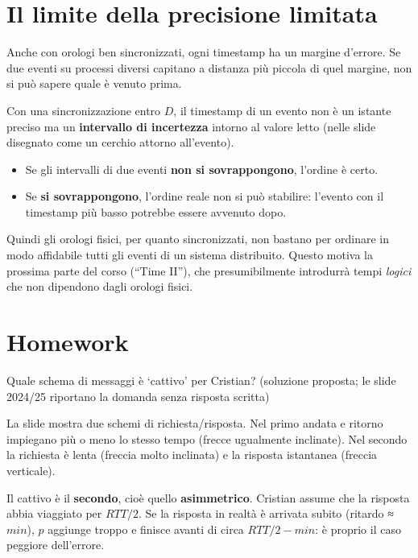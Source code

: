 \section{Il limite della precisione limitata}

\begin{inbreve}

Anche con orologi ben sincronizzati, ogni timestamp ha un margine d'errore. Se due eventi su processi diversi capitano a distanza più piccola di quel margine, non si può sapere quale è venuto prima.

\end{inbreve}

Con una sincronizzazione entro \(D\), il timestamp di un evento non è un istante preciso ma un \textbf{intervallo di incertezza} intorno al valore letto (nelle slide disegnato come un cerchio attorno all'evento).

\begin{itemize}
\tightlist
\item
  Se gli intervalli di due eventi \textbf{non si sovrappongono}, l'ordine è certo.
\item
  Se \textbf{si sovrappongono}, l'ordine reale non si può stabilire: l'evento con il timestamp più basso potrebbe essere avvenuto dopo.
\end{itemize}

Quindi gli orologi fisici, per quanto sincronizzati, non bastano per ordinare in modo affidabile tutti gli eventi di un sistema distribuito. Questo motiva la prossima parte del corso (``Time II''), che presumibilmente introdurrà tempi \emph{logici} che non dipendono dagli orologi fisici.

\section{Homework}

\begin{approfondimento}{Quale schema di messaggi è `cattivo' per Cristian? (soluzione proposta;
le slide 2024/25 riportano la domanda senza risposta scritta)}

La slide mostra due schemi di richiesta/risposta. Nel primo andata e ritorno impiegano più o meno lo stesso tempo (frecce ugualmente inclinate). Nel secondo la richiesta è lenta (freccia molto inclinata) e la risposta istantanea (freccia verticale).

Il cattivo è il \textbf{secondo}, cioè quello \textbf{asimmetrico}. Cristian assume che la risposta abbia viaggiato per \(RTT/2\). Se la risposta in realtà è arrivata subito (ritardo ≈ \(min\)), \(p\) aggiunge troppo e finisce avanti di circa \(RTT/2 - min\): è proprio il caso peggiore dell'errore.

\end{approfondimento}


